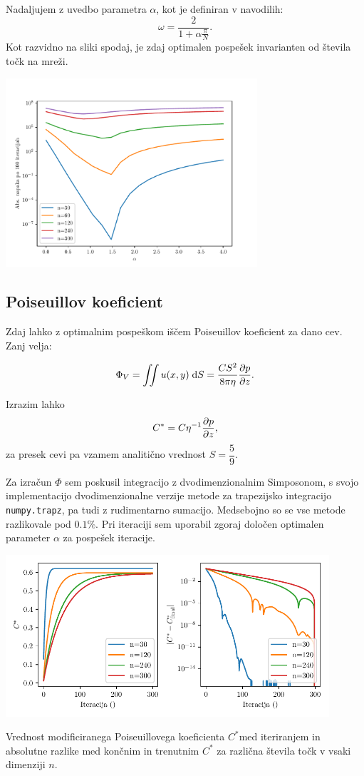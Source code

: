 Nadaljujem z uvedbo parametra $\alpha$, kot je definiran v navodilih:
\[\omega = \frac{2}{1+\alpha \frac{\pi}{N}}.\]
Kot razvidno na sliki spodaj, je zdaj optimalen pospešek invarianten od števila točk na mreži.
\begin{center}
    \includegraphics[width=0.7\textwidth]{../old/1-alphas.pdf}
\end{center}
\subsection{Poiseuillov koeficient}
Zdaj lahko z optimalnim pospeškom iščem Poiseuillov koeficient za dano cev. Zanj velja:

\[ \Phi_V = \iint u(x,y) \; \mathrm{d}S = \frac{C S^2}{8 \pi \eta} \frac{\partial p}{\partial z}.\]

Izrazim lahko \[ C^{*} = C \eta^{-1} \frac{\partial p}{\partial z},\] za presek cevi pa vzamem analitično vrednost $S = \dfrac{5}{9}.$

Za izračun $\Phi$ sem poskusil integracijo z dvodimenzionalnim Simposonom, s svojo implementacijo dvodimenzionalne verzije metode za trapezijsko integracijo \texttt{numpy.trapz}, pa tudi z rudimentarno sumacijo. Medsebojno so se vse metode razlikovale pod $0.1 \%$. Pri iteraciji sem uporabil zgoraj določen optimalen parameter $\alpha$ za pospešek iteracije.

\begin{center}
    \includegraphics[width=0.9\textwidth]{../old/1-C__.pdf}


    {Vrednost modificiranega Poiseuillovega koeficienta $C^{*}$med iteriranjem in absolutne razlike med končnim in trenutnim $C^{*}$ za različna števila točk v vsaki dimenziji $n$.}
\end{center}

